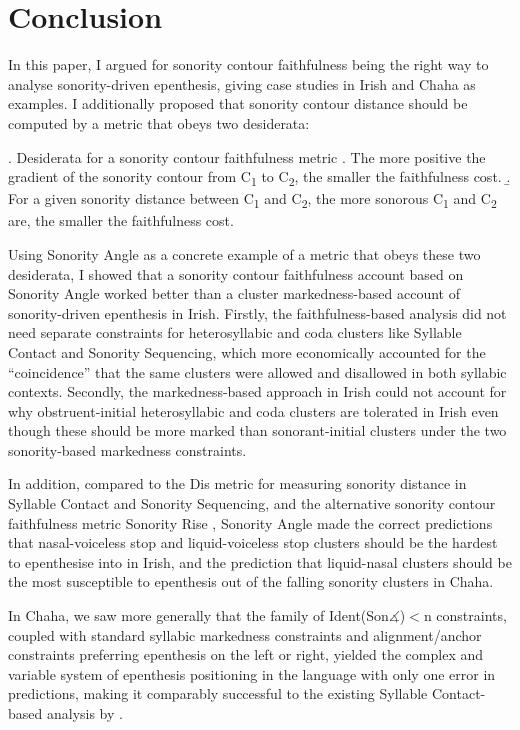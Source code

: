 \documentclass[12pt]{article}
\begin{document}
\section{Conclusion} \label{conclusion}

In this paper, I argued for sonority contour faithfulness being the right way to analyse sonority-driven epenthesis, giving case studies in Irish and Chaha as examples. I additionally proposed that sonority contour distance should be computed by a metric that obeys two desiderata:

\ex. Desiderata for a sonority contour faithfulness metric 
     \a. The more positive the gradient of the sonority contour from C\textsubscript{1} to C\textsubscript{2}, the smaller the faithfulness cost. 
     \b. For a given sonority distance between C\textsubscript{1} and C\textsubscript{2}, the more sonorous C\textsubscript{1} and C\textsubscript{2} are, the smaller the faithfulness cost.

Using {\sc Sonority Angle} as a concrete example of a metric that obeys these two desiderata, I showed that  a sonority contour faithfulness account based on {\sc Sonority Angle} worked better than a cluster markedness-based account of sonority-driven epenthesis in Irish. Firstly, the faithfulness-based analysis did not need separate constraints for heterosyllabic and coda clusters like Syllable Contact and Sonority Sequencing, which more economically accounted for the ``coincidence'' that the same clusters were allowed and disallowed in both syllabic contexts. Secondly, the markedness-based approach in Irish could not account for why obstruent-initial heterosyllabic and coda clusters are tolerated in Irish even though these should be more marked than sonorant-initial clusters under the two sonority-based markedness constraints.

In addition, compared to the {\sc *Dis} metric \citep{gouskova.2002} for measuring sonority distance in Syllable Contact and Sonority Sequencing, and the alternative sonority contour faithfulness metric {\sc Sonority Rise} \citep{flemming.2008}, {\sc Sonority Angle} made the correct predictions that nasal-voiceless stop and liquid-voiceless stop clusters should be the hardest to epenthesise into in Irish, and the prediction that liquid-nasal clusters should be the most susceptible to epenthesis out of the falling sonority clusters in Chaha.

In Chaha, we saw more generally that the family of {\sc Ident(Son$\measuredangle$)}$<$n constraints, coupled with standard syllabic markedness constraints and alignment/anchor constraints preferring epenthesis on the left or right, yielded the complex and variable system of epenthesis positioning in the language with only one error in predictions, making it comparably successful to the existing Syllable Contact-based analysis by \cite{rose.2000}.
\end{document}
